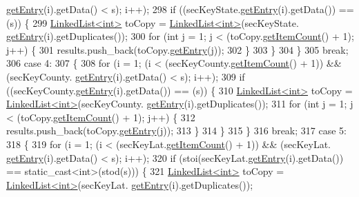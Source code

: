 \begin{DoxyCode}
      \hyperlink{classLinkedList_a341bfd7772c9d24d29eb7a7f3936915b}{getEntry}(i).getData() < s); i++);
298         \textcolor{keywordflow}{if} ((secKeyState.\hyperlink{classLinkedList_a341bfd7772c9d24d29eb7a7f3936915b}{getEntry}(i).getData()) == (s)) \{
299             \hyperlink{classLinkedList}{LinkedList<int>} toCopy = \hyperlink{classLinkedList}{LinkedList<int>}(secKeyState.
      \hyperlink{classLinkedList_a341bfd7772c9d24d29eb7a7f3936915b}{getEntry}(i).getDuplicates());
300             \textcolor{keywordflow}{for} (\textcolor{keywordtype}{int} j = 1; j < (toCopy.\hyperlink{classLinkedList_afc6635f854f48f2f126cf3b60d845220}{getItemCount}() + 1); j++) \{
301                 results.push\_back(toCopy.\hyperlink{classLinkedList_a341bfd7772c9d24d29eb7a7f3936915b}{getEntry}(j));
302             \}
303         \}
304     \}
305     \textcolor{keywordflow}{break};
306     \textcolor{keywordflow}{case} 4:
307     \{
308         \textcolor{keywordflow}{for} (i = 1; (i < (secKeyCounty.\hyperlink{classLinkedList_afc6635f854f48f2f126cf3b60d845220}{getItemCount}() + 1)) && (secKeyCounty.
      \hyperlink{classLinkedList_a341bfd7772c9d24d29eb7a7f3936915b}{getEntry}(i).getData() < s); i++);
309         \textcolor{keywordflow}{if} ((secKeyCounty.\hyperlink{classLinkedList_a341bfd7772c9d24d29eb7a7f3936915b}{getEntry}(i).getData()) == (s)) \{
310             \hyperlink{classLinkedList}{LinkedList<int>} toCopy = \hyperlink{classLinkedList}{LinkedList<int>}(secKeyCounty.
      \hyperlink{classLinkedList_a341bfd7772c9d24d29eb7a7f3936915b}{getEntry}(i).getDuplicates());
311             \textcolor{keywordflow}{for} (\textcolor{keywordtype}{int} j = 1; j < (toCopy.\hyperlink{classLinkedList_afc6635f854f48f2f126cf3b60d845220}{getItemCount}() + 1); j++) \{
312                 results.push\_back(toCopy.\hyperlink{classLinkedList_a341bfd7772c9d24d29eb7a7f3936915b}{getEntry}(j));
313             \}
314         \}
315     \}
316     \textcolor{keywordflow}{break};
317     \textcolor{keywordflow}{case} 5:
318     \{
319         \textcolor{keywordflow}{for} (i = 1; (i < (secKeyLat.\hyperlink{classLinkedList_afc6635f854f48f2f126cf3b60d845220}{getItemCount}() + 1)) && (secKeyLat.
      \hyperlink{classLinkedList_a341bfd7772c9d24d29eb7a7f3936915b}{getEntry}(i).getData() < s); i++);
320         \textcolor{keywordflow}{if} (stoi(secKeyLat.\hyperlink{classLinkedList_a341bfd7772c9d24d29eb7a7f3936915b}{getEntry}(i).getData()) == static\_cast<int>(stod(s))) \{
321             \hyperlink{classLinkedList}{LinkedList<int>} toCopy = \hyperlink{classLinkedList}{LinkedList<int>}(secKeyLat.
      \hyperlink{classLinkedList_a341bfd7772c9d24d29eb7a7f3936915b}{getEntry}(i).getDuplicates());

\end{DoxyCode}
